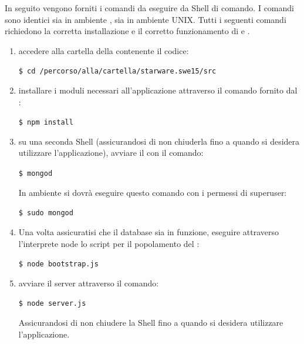 \documentclass[12pt,a4paper]{article}
\begin{document}
	In seguito vengono forniti i comandi da eseguire da Shell di comando. I comandi sono identici sia in ambiente , sia in ambiente UNIX.
	Tutti i seguenti comandi richiedono la corretta installazione e il corretto funzionamento di  e .
	\begin{enumerate}
		\item accedere alla cartella della  contenente il codice:
		\begin{center}
			\texttt{\$ cd /percorso/alla/cartella/starware.swe15/src} 
		\end{center}
		\item installare i moduli  necessari all'applicazione attraverso il comando fornito dal :
		\begin{center}
			\texttt{\$ npm install} 
		\end{center}
		\item su una seconda Shell (assicurandosi di non chiuderla fino a quando si desidera utilizzare l'applicazione), avviare il   con il comando:
		\begin{center}
			\texttt{\$ mongod} 	
		\end{center}	
		In ambiente  si dovrà eseguire questo comando con i permessi di superuser:
		\begin{center}
			\texttt{\$ sudo mongod} 	
		\end{center}
		\item Una volta assicuratisi che il database sia in funzione, eseguire attraverso l'interprete node lo script per il popolamento del :
		\begin{center}
			\texttt{\$ node bootstrap.js} 	
		\end{center} 
		\item avviare il server  attraverso il comando:
		\begin{center}
			\texttt{\$ node server.js} 	
		\end{center} 
		Assicurandosi di non chiudere la Shell fino a quando si desidera utilizzare l'applicazione.
			
	\end{enumerate}
		
\end{document}
